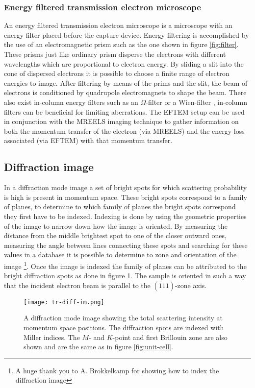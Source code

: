 \subsubsection{Energy filtered transmission electron microscope}
\label{sec:eftem}
An energy filtered transmission electron microscope is a microscope with an energy filter placed before the capture device. Energy filtering is accomplished by the use of an electromagnetic prism such as the one shown in figure \ref{fig:filter}.
These prisms just like ordinary prism disperse the electrons with different wavelengths which are proportional to electron energy. By sliding a slit into the cone of dispersed electrons it is possible to choose a finite range of electron energies to image.
After filtering by means of the prims and the slit, the beam of electrons is conditioned by quadrupole electromagnets to shape the beam.\cite{KAHL201935}
There also exist in-column energy filters such as an $\Omega$-filter \cite{sigma_filter} or a Wien-filter \cite{wien}, in-column filters can be beneficial for limiting aberrations.\cite{Egerton_2008}
The EFTEM setup can be used in conjunction with the MREELS imaging technique to gather information on both the momentum transfer of the electron (via MREELS) and the energy-loss associated (via EFTEM) with that momentum transfer.
%
\subsection{Diffraction image}
In a diffraction mode image a set of bright spots for which scattering probability is high is present in momentum space. These bright spots correspond to a family of planes, to determine to which family of planes the bright spots correspond they first have to be indexed. Indexing is done by using the geometric properties of the image to narrow down how the image is oriented.
By measuring the distance from the middle brightest spot to one of the closer outward ones, measuring the angle between lines connecting these spots and searching for these values in a database it is possible to determine to zone and orientation of the image \footnote{A huge thank you to A. Brokkelkamp for showing how to index the diffraction image}. Once the image is indexed the family of planes can be attributed to the bright diffraction spots as done in figure \ref{fig:tr-diff-im}. The sample is oriented in such a way that the incident electron beam is parallel to the $(\overline{1} 1 1)$-zone axis.

\begin{figure}[H]
	\centering
	\texttt{[image: tr-diff-im.png]}
	\caption{A diffraction mode image showing the total scattering intensity at momentum space positions. The diffraction spots are indexed with Miller indices. The $M$- and $K$-point and first Brillouin zone are also shown and are the same as in figure \ref{fig:unit-cell}.}
	\label{fig:tr-diff-im}
\end{figure}
%
